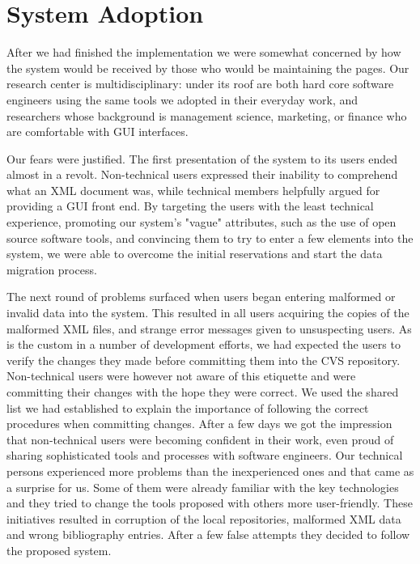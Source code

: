 \documentclass[10pt]{article}
\begin{document}
\section{System Adoption}
\label{sec:adopt}
After we had finished the implementation we were somewhat concerned
by how the system would be received by those who would be
maintaining the pages.
Our research center is multidisciplinary: under its roof
are both hard core software engineers using the same tools
we adopted in their everyday work, and researchers whose
background is management science, marketing, or finance
who are comfortable with {\sc GUI} interfaces.

Our fears were justified.
The first presentation of the system to its users ended
almost in a revolt.
Non-technical users expressed their inability to comprehend
what an {\sc XML} document was, while technical members
helpfully argued for providing a {\sc GUI} front end.
By targeting the users with the least technical experience,
promoting our system's "vague" attributes,
such as the use of open source software tools,
and convincing them to try to enter a few elements into
the system, we were able to overcome the initial reservations
and start the data migration process.

The next round of problems surfaced when users began entering
malformed or invalid data into the system.
This resulted in all users acquiring the copies of the malformed
{\sc XML} files, and strange error messages given to unsuspecting
users.
As is the custom in a number of development efforts, we had
expected the users to verify the changes they made before
committing them into the {\sc CVS} repository.
Non-technical users were however not aware of this etiquette
and were committing their changes with the hope they were correct.
We used the shared list we had established to explain the
importance of following the correct procedures when committing changes.
After a few days we got the impression that non-technical users
were becoming confident in their work, even proud of sharing
sophisticated tools and processes with software engineers.
Our technical persons experienced more problems than the inexperienced ones 
and that came as a surprise for us. Some of them were already familiar 
with the key technologies and they tried to change the tools proposed with others 
more user-friendly. 
These initiatives resulted in corruption of the local repositories, malformed 
{\sc XML} data and wrong bibliography entries.
After a few false attempts they decided to follow the proposed system.
\end{document}
